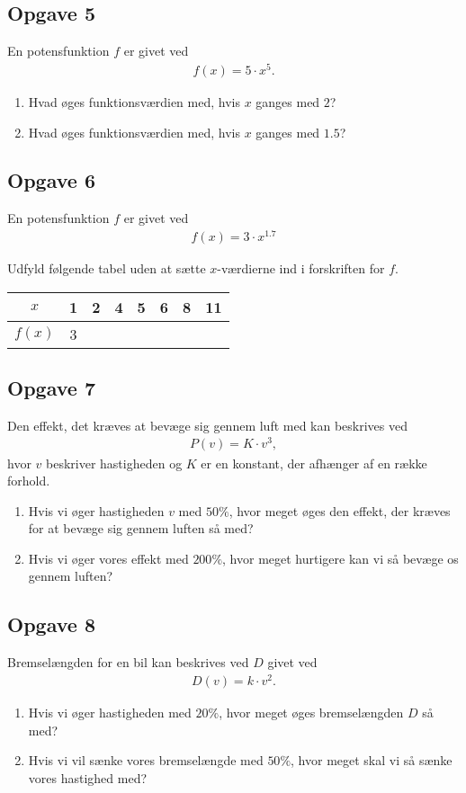 \subsection*{Opgave 5}
En potensfunktion $f$ er givet ved
\begin{align*}
	f(x) = 5\cdot x^5.
\end{align*}
\begin{enumerate}[label=\roman*)]
	\item Hvad øges funktionsværdien med, hvis $x$ ganges med $2$?
	\item Hvad øges funktionsværdien med, hvis $x$ ganges med $1.5$?
\end{enumerate}

\subsection*{Opgave 6}
En potensfunktion $f$ er givet ved
\begin{align*}
	f(x) = 3 \cdot x^{1.7}
\end{align*}

Udfyld følgende tabel uden at sætte $x$-værdierne ind i forskriften for $f$.
\begin{center}
	\begin{tabular}{c|c|c|c|c|c|c|c}
		$x$ & 1 & 2 & 4 & 5 & 6 & 8 & 11 \\ \hline
		$f(x)$ & 3 & & & & & &
	\end{tabular}
\end{center}

\subsection*{Opgave 7}
Den effekt, det kræves at bevæge sig gennem luft med kan beskrives ved 
\begin{align*}
P(v) = K\cdot v^3,
\end{align*}
hvor $v$ beskriver hastigheden og $K$ er en konstant, der afhænger af en række forhold.
\begin{enumerate}[label=\roman*)]
\item Hvis vi øger hastigheden $v$ med $50\%$, hvor meget øges den effekt, der kræves for at bevæge sig gennem luften så med? 
\item Hvis vi øger vores effekt med $200\%$, hvor meget hurtigere kan vi så bevæge os gennem luften?
\end{enumerate}
\subsection*{Opgave 8}
Bremselængden for en bil kan beskrives ved $D$ givet ved
\begin{align*}
D(v) = k\cdot v^2.
\end{align*}
\begin{enumerate}[label=\roman*)]
\item Hvis vi øger hastigheden med $20\%$, hvor meget øges bremselængden $D$ så med?
\item Hvis vi vil sænke vores bremselængde med $50\%$, hvor meget skal vi så sænke vores hastighed med?
\end{enumerate}


